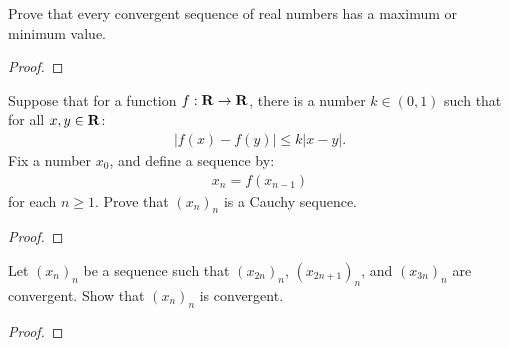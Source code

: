 \documentclass[11pt,twoside,openany]{memoir}
\begin{document}
\newpage
\fancyhead[L]{\scalebox{0.9}{Sequences}}
\fancyhead[R]{\scalebox{0.9}{Appeared on: S22}}
\begin{problem}
    Prove that every convergent sequence of real numbers has a maximum or minimum value.
\end{problem}
\begin{proof}
\end{proof}

\newpage
\fancyhead[L]{\scalebox{0.9}{Sequences}}
\fancyhead[R]{\scalebox{0.9}{Appeared on: S22}}
\begin{problem}
    Suppose that for a function $f:\mathbf{R} \rightarrow \mathbf{R}$, there is a number $k \in (0,1)$ such that for all $x,y \in \mathbf{R}$:
        \begin{equation*}
        \begin{split}
            |f(x) - f(y)| \leq k|x-y|.
        \end{split}
        \end{equation*}
    Fix a number $x_0$, and define a sequence by:
        \begin{equation*}
        \begin{split}
            x_n = f(x_{n-1})
        \end{split}
        \end{equation*}
    for each $n \geq 1$. Prove that $(x_n)_n$ is a Cauchy sequence.
\end{problem}
\begin{proof}
\end{proof}

\newpage
\fancyhead[L]{\scalebox{0.9}{Sequences}}
\fancyhead[R]{\scalebox{0.9}{Appeared on: W22}}
\begin{problem}
    Let $(x_n)_n$ be a sequence such that $(x_{2n})_n$, $(x_{2n+1})_n$, and $(x_{3n})_n$ are convergent. Show that $(x_n)_n$ is convergent.
\end{problem}
\begin{proof}
\end{proof}
\end{document}
